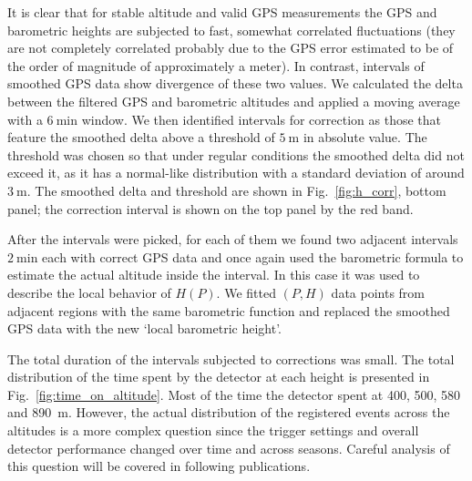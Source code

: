 \documentclass[final,5p,times,twocolumn]{elsarticle}
\begin{document}
It is clear that for stable altitude and valid GPS measurements the GPS and barometric heights are subjected to fast, somewhat correlated fluctuations (they are not completely correlated probably due to the GPS error estimated to be of the order of magnitude of approximately a meter). In contrast, intervals of smoothed GPS data show divergence of these two values. We calculated the delta between the filtered GPS and barometric altitudes and applied a moving average with a $6~\textrm{min}$ window. We then identified intervals for correction as those that feature the smoothed delta above a threshold of $5~\textrm{m}$ in absolute value. The threshold was chosen so that  under regular conditions the smoothed delta did not exceed it, as it has a normal-like distribution with a standard deviation of around $3~\textrm{m}$. The smoothed delta and threshold are shown in Fig.~\ref{fig:h_corr}, bottom panel; the correction interval is shown on the top panel by the red band.

After the intervals were picked, for each of them we found two adjacent intervals $2~\textrm{min}$ each with correct GPS data and once again used the barometric formula to estimate the actual altitude inside the interval. In this case it was used to describe the local behavior of $H(P)$. We fitted $(P, H)$ data points from adjacent regions with the same barometric function and replaced the smoothed GPS data with the new `local barometric height'.

The total duration of the intervals subjected to corrections was small. The total distribution of the time spent by the detector at each height is presented in Fig.~\ref{fig:time_on_altitude}. Most of the time the detector spent at 400, 500, 580 and 890~m. However, the actual distribution of the registered events across the altitudes is a more complex question since the trigger settings and overall detector performance changed over time and across seasons. Careful analysis of this question will be covered in following publications.
\end{document}
